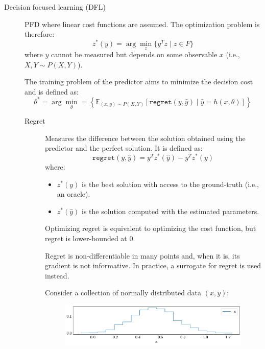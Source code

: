 \begin{description}
    \item[Decision focused learning (DFL)] 
        PFD where linear cost functions are assumed. The optimization problem is therefore:
        \[ z^*(y) = \arg\min_z \{ y^Tz \mid z \in F \} \]
        where $y$ cannot be measured but depends on some observable $x$ (i.e., $X, Y \sim P(X, Y)$).

        The training problem of the predictor aims to minimize the decision cost and is defined as:
        \[ 
            \theta^* = \arg\min_\theta = \left\{ \mathbb{E}_{(x, y) \sim P(X,Y)} \left[ \texttt{regret}(y, \hat{y}) \mid \hat{y} = h(x, \theta) \right] \right\} 
        \]

        \begin{description}
            \item[Regret] 
                Measures the difference between the solution obtained using the predictor and the perfect solution. It is defined as:
                \[ \texttt{regret}(y, \hat{y}) = y^T z^*(\hat{y}) - y^T z^*(y) \]
                where:
                \begin{itemize}
                    \item $z^*(y)$ is the best solution with access to the ground-truth (i.e., an oracle).
                    \item $z^*(\hat{y})$ is the solution computed with the estimated parameters.
                \end{itemize}

                \begin{remark}
                    Optimizing regret is equivalent to optimizing the cost function, but regret is lower-bounded at $0$.
                \end{remark}

                \begin{remark}
                    Regret is non-differentiable in many points and, when it is, its gradient is not informative. In practice, a surrogate for regret is used instead.
                \end{remark}

                \begin{example}
                    Consider a collection of normally distributed data $(x, y)$:
                    \begin{figure}[H]
                        \centering
                        \includegraphics[width=0.75\linewidth]{./img/_dfl_regret_example1.pdf}
                    \end{figure}


\end{example}
\end{description}
\end{description}
